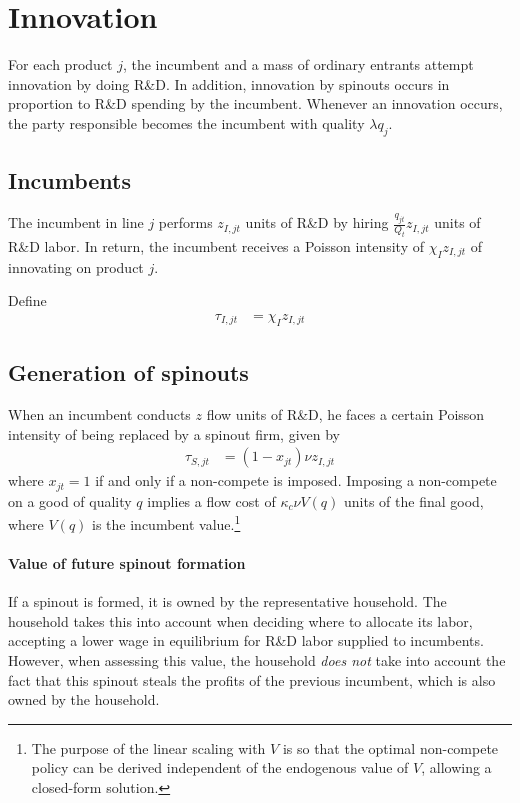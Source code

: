 \documentclass[12pt,english]{article}
\theoremstyle{remark}
\begin{document}
\section{Innovation}

For each product $j$, the incumbent and a mass of ordinary entrants attempt innovation by doing R\&D. In addition, innovation by spinouts occurs in proportion to R\&D spending by the incumbent. Whenever an innovation occurs, the party responsible becomes the incumbent with quality $\lambda q_j$. 

\subsection{Incumbents}

The incumbent in line $j$ performs $z_{I,jt}$ units of R\&D by hiring $\frac{q_{jt}}{Q_t}z_{I,jt}$ units of R\&D labor. In return, the incumbent receives a Poisson intensity of $\chi_I z_{I,jt}$ of innovating on product $j$. 

Define
\begin{align}
	\tau_{I,jt} &= \chi_I z_{I,jt}
\end{align}


\subsection{Generation of spinouts}

When an incumbent conducts $z$ flow units of R\&D, he faces a certain Poisson intensity of being replaced by a spinout firm, given by 
\begin{align*}
	\tau_{S,jt} &= (1-x_{jt}) \nu z_{I,jt}
\end{align*} 
where $x_{jt} = 1$ if and only if a non-compete is imposed. Imposing a non-compete on a good of quality $q$ implies a flow cost of $\kappa_{c} \nu V(q)$ units of the final good, where $V(q)$ is the incumbent value.\footnote{The purpose of the linear scaling with $V$ is so that the optimal non-compete policy can be derived independent of the endogenous value of $V$, allowing a closed-form solution.}

\paragraph{Value of future spinout formation}

If a spinout is formed, it is owned by the representative household. The household takes this into account when deciding where to allocate its labor, accepting a lower wage in equilibrium for R\&D labor supplied to incumbents. However, when assessing this value, the household \textit{does not} take into account the fact that this spinout steals the profits of the previous incumbent, which is also owned by the household. 
\end{document}
